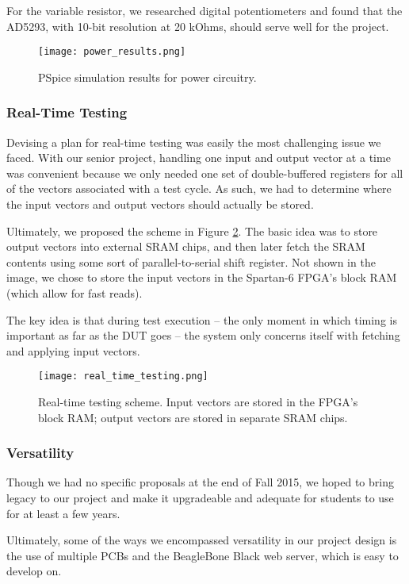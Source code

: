 For the variable resistor, we researched digital potentiometers and found that the AD5293, with 10-bit resolution at 20 kOhms, should serve well for the project.

\begin{figure}
\texttt{[image: power\_results.png]}
\caption{PSpice simulation results for power circuitry.}
\label{fig:power_results}
\end{figure}

\subsubsection{Real-Time Testing}
Devising a plan for real-time testing was easily the most challenging issue we faced. With our senior project, handling one input and output vector at a time was convenient because we only needed one set of double-buffered registers for all of the vectors associated with a test cycle. As such, we had to determine where the input vectors and output vectors should actually be stored.

Ultimately, we proposed the scheme in Figure \ref{fig:real_time_testing}. The basic idea was to store output vectors into external SRAM chips, and then later fetch the SRAM contents using some sort of parallel-to-serial shift register. Not shown in the image, we chose to store the input vectors in the Spartan-6 FPGA's block RAM (which allow for fast reads).

The key idea is that during test execution -- the only moment in which timing is important as far as the DUT goes -- the system only concerns itself with fetching and applying input vectors. 

\begin{figure}
\texttt{[image: real\_time\_testing.png]}
\caption{Real-time testing scheme. Input vectors are stored in the FPGA's block RAM; output vectors are stored in separate SRAM chips.}
\label{fig:real_time_testing}
\end{figure}

\subsubsection{Versatility}
Though we had no specific proposals at the end of Fall 2015, we hoped to bring legacy to our project and make it upgradeable and adequate for students to use for at least a few years.

Ultimately, some of the ways we encompassed versatility in our project design is the use of multiple PCBs and the BeagleBone Black web server, which is easy to develop on.

\newpage